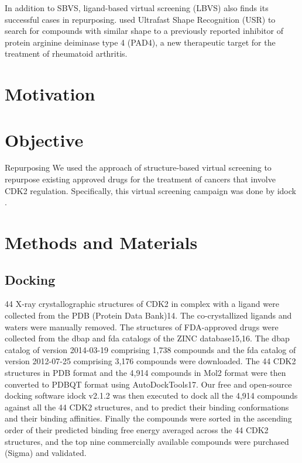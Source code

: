 In addition to SBVS, ligand-based virtual screening (LBVS) also finds its successful cases in repurposing. \citep{1504} used Ultrafast Shape Recognition (USR) \citep{1379} to search for compounds with similar shape to a previously reported inhibitor of protein arginine deiminase type 4 (PAD4), a new therapeutic target for the treatment of rheumatoid arthritis.


\section{Motivation}



\section{Objective}

Repurposing
We used the approach of structure-based virtual screening to repurpose existing approved drugs for the treatment of cancers that involve CDK2 regulation. Specifically, this virtual screening campaign was done by idock \citep{1153}.

\section{Methods and Materials}

\subsection{Docking}

44 X-ray crystallographic structures of CDK2 in complex with a ligand were collected from the PDB (Protein Data Bank)14. The co-crystallized ligands and waters were manually removed. The structures of FDA-approved drugs were collected from the dbap and fda catalogs of the ZINC database15,16. The dbap catalog of version 2014-03-19 comprising 1,738 compounds and the fda catalog of version 2012-07-25 comprising 3,176 compounds were downloaded. The 44 CDK2 structures in PDB format and the 4,914 compounds in Mol2 format were then converted to PDBQT format using AutoDockTools17. Our free and open-source docking software idock v2.1.2 \citep{1153,1362} was then executed to dock all the 4,914 compounds against all the 44 CDK2 structures, and to predict their binding conformations and their binding affinities. Finally the compounds were sorted in the ascending order of their predicted binding free energy averaged across the 44 CDK2 structures, and the top nine commercially available compounds were purchased (Sigma) and validated.

